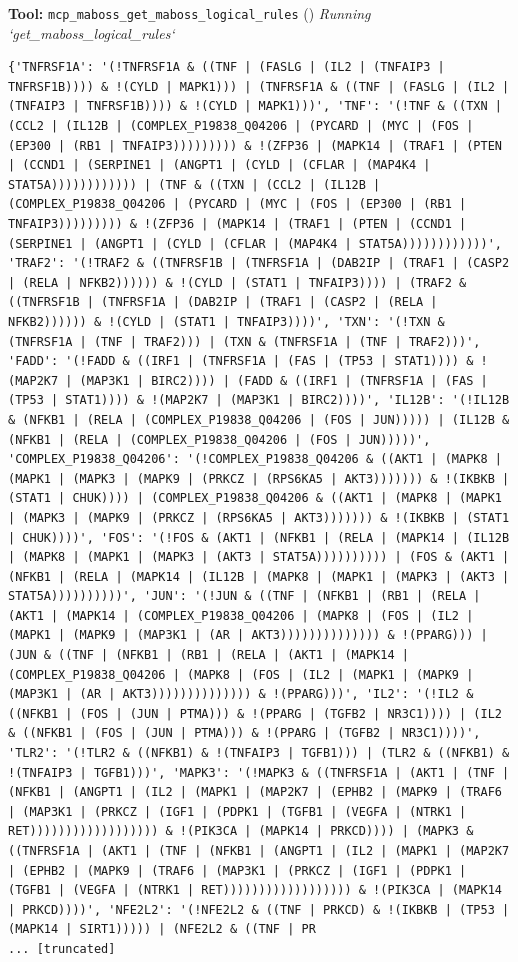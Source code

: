 \documentclass[11pt,a4paper]{article}
\begin{document}
\begin{toolokbox}
\textbf{Tool:} \texttt{mcp\_maboss\_get\_maboss\_logical\_rules} (\checkmark)
\textit{Running `get\_maboss\_logical\_rules`}
\begin{lstlisting}
{'TNFRSF1A': '(!TNFRSF1A & ((TNF | (FASLG | (IL2 | (TNFAIP3 | TNFRSF1B)))) & !(CYLD | MAPK1))) | (TNFRSF1A & ((TNF | (FASLG | (IL2 | (TNFAIP3 | TNFRSF1B)))) & !(CYLD | MAPK1)))', 'TNF': '(!TNF & ((TXN | (CCL2 | (IL12B | (COMPLEX_P19838_Q04206 | (PYCARD | (MYC | (FOS | (EP300 | (RB1 | TNFAIP3))))))))) & !(ZFP36 | (MAPK14 | (TRAF1 | (PTEN | (CCND1 | (SERPINE1 | (ANGPT1 | (CYLD | (CFLAR | (MAP4K4 | STAT5A)))))))))))) | (TNF & ((TXN | (CCL2 | (IL12B | (COMPLEX_P19838_Q04206 | (PYCARD | (MYC | (FOS | (EP300 | (RB1 | TNFAIP3))))))))) & !(ZFP36 | (MAPK14 | (TRAF1 | (PTEN | (CCND1 | (SERPINE1 | (ANGPT1 | (CYLD | (CFLAR | (MAP4K4 | STAT5A))))))))))))', 'TRAF2': '(!TRAF2 & ((TNFRSF1B | (TNFRSF1A | (DAB2IP | (TRAF1 | (CASP2 | (RELA | NFKB2)))))) & !(CYLD | (STAT1 | TNFAIP3)))) | (TRAF2 & ((TNFRSF1B | (TNFRSF1A | (DAB2IP | (TRAF1 | (CASP2 | (RELA | NFKB2)))))) & !(CYLD | (STAT1 | TNFAIP3))))', 'TXN': '(!TXN & (TNFRSF1A | (TNF | TRAF2))) | (TXN & (TNFRSF1A | (TNF | TRAF2)))', 'FADD': '(!FADD & ((IRF1 | (TNFRSF1A | (FAS | (TP53 | STAT1)))) & !(MAP2K7 | (MAP3K1 | BIRC2)))) | (FADD & ((IRF1 | (TNFRSF1A | (FAS | (TP53 | STAT1)))) & !(MAP2K7 | (MAP3K1 | BIRC2))))', 'IL12B': '(!IL12B & (NFKB1 | (RELA | (COMPLEX_P19838_Q04206 | (FOS | JUN))))) | (IL12B & (NFKB1 | (RELA | (COMPLEX_P19838_Q04206 | (FOS | JUN)))))', 'COMPLEX_P19838_Q04206': '(!COMPLEX_P19838_Q04206 & ((AKT1 | (MAPK8 | (MAPK1 | (MAPK3 | (MAPK9 | (PRKCZ | (RPS6KA5 | AKT3))))))) & !(IKBKB | (STAT1 | CHUK)))) | (COMPLEX_P19838_Q04206 & ((AKT1 | (MAPK8 | (MAPK1 | (MAPK3 | (MAPK9 | (PRKCZ | (RPS6KA5 | AKT3))))))) & !(IKBKB | (STAT1 | CHUK))))', 'FOS': '(!FOS & (AKT1 | (NFKB1 | (RELA | (MAPK14 | (IL12B | (MAPK8 | (MAPK1 | (MAPK3 | (AKT3 | STAT5A)))))))))) | (FOS & (AKT1 | (NFKB1 | (RELA | (MAPK14 | (IL12B | (MAPK8 | (MAPK1 | (MAPK3 | (AKT3 | STAT5A))))))))))', 'JUN': '(!JUN & ((TNF | (NFKB1 | (RB1 | (RELA | (AKT1 | (MAPK14 | (COMPLEX_P19838_Q04206 | (MAPK8 | (FOS | (IL2 | (MAPK1 | (MAPK9 | (MAP3K1 | (AR | AKT3)))))))))))))) & !(PPARG))) | (JUN & ((TNF | (NFKB1 | (RB1 | (RELA | (AKT1 | (MAPK14 | (COMPLEX_P19838_Q04206 | (MAPK8 | (FOS | (IL2 | (MAPK1 | (MAPK9 | (MAP3K1 | (AR | AKT3)))))))))))))) & !(PPARG)))', 'IL2': '(!IL2 & ((NFKB1 | (FOS | (JUN | PTMA))) & !(PPARG | (TGFB2 | NR3C1)))) | (IL2 & ((NFKB1 | (FOS | (JUN | PTMA))) & !(PPARG | (TGFB2 | NR3C1))))', 'TLR2': '(!TLR2 & ((NFKB1) & !(TNFAIP3 | TGFB1))) | (TLR2 & ((NFKB1) & !(TNFAIP3 | TGFB1)))', 'MAPK3': '(!MAPK3 & ((TNFRSF1A | (AKT1 | (TNF | (NFKB1 | (ANGPT1 | (IL2 | (MAPK1 | (MAP2K7 | (EPHB2 | (MAPK9 | (TRAF6 | (MAP3K1 | (PRKCZ | (IGF1 | (PDPK1 | (TGFB1 | (VEGFA | (NTRK1 | RET)))))))))))))))))) & !(PIK3CA | (MAPK14 | PRKCD)))) | (MAPK3 & ((TNFRSF1A | (AKT1 | (TNF | (NFKB1 | (ANGPT1 | (IL2 | (MAPK1 | (MAP2K7 | (EPHB2 | (MAPK9 | (TRAF6 | (MAP3K1 | (PRKCZ | (IGF1 | (PDPK1 | (TGFB1 | (VEGFA | (NTRK1 | RET)))))))))))))))))) & !(PIK3CA | (MAPK14 | PRKCD))))', 'NFE2L2': '(!NFE2L2 & ((TNF | PRKCD) & !(IKBKB | (TP53 | (MAPK14 | SIRT1))))) | (NFE2L2 & ((TNF | PR
... [truncated]
\end{lstlisting}
\end{toolokbox}
\end{document}
